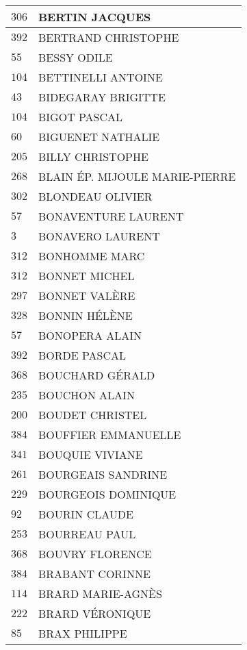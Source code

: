 \begin{xltabular}{\linewidth}{|l|X|}
    $306$ & BERTIN JACQUES \\
    \hline
    $392$ & BERTRAND CHRISTOPHE \\
    \hline
    $55$ & BESSY ODILE \\
    \hline
    $104$ & BETTINELLI ANTOINE \\
    \hline
    $43$ & BIDEGARAY BRIGITTE \\
    \hline
    $104$ & BIGOT PASCAL \\
    \hline
    $60$ & BIGUENET NATHALIE \\
    \hline
    $205$ & BILLY CHRISTOPHE \\
    \hline
    $268$ & BLAIN ÉP. MIJOULE MARIE-PIERRE \\
    \hline
    $302$ & BLONDEAU OLIVIER \\
    \hline
    $57$ & BONAVENTURE LAURENT \\
    \hline
    $3$ & BONAVERO LAURENT \\
    \hline
    $312$ & BONHOMME MARC \\
    \hline
    $312$ & BONNET MICHEL \\
    \hline
    $297$ & BONNET VALÈRE \\
    \hline
    $328$ & BONNIN HÉLÈNE \\
    \hline
    $57$ & BONOPERA ALAIN \\
    \hline
    $392$ & BORDE PASCAL \\
    \hline
    $368$ & BOUCHARD GÉRALD \\
    \hline
    $235$ & BOUCHON ALAIN \\
    \hline
    $200$ & BOUDET CHRISTEL \\
    \hline
    $384$ & BOUFFIER EMMANUELLE \\
    \hline
    $341$ & BOUQUIE VIVIANE \\
    \hline
    $261$ & BOURGEAIS SANDRINE \\
    \hline
    $229$ & BOURGEOIS DOMINIQUE \\
    \hline
    $92$ & BOURIN CLAUDE \\
    \hline
    $253$ & BOURREAU PAUL \\
    \hline
    $368$ & BOUVRY FLORENCE \\
    \hline
    $384$ & BRABANT CORINNE \\
    \hline
    $114$ & BRARD MARIE-AGNÈS \\
    \hline
    $222$ & BRARD VÉRONIQUE \\
    \hline
    $85$ & BRAX PHILIPPE \\

\end{xltabular}
